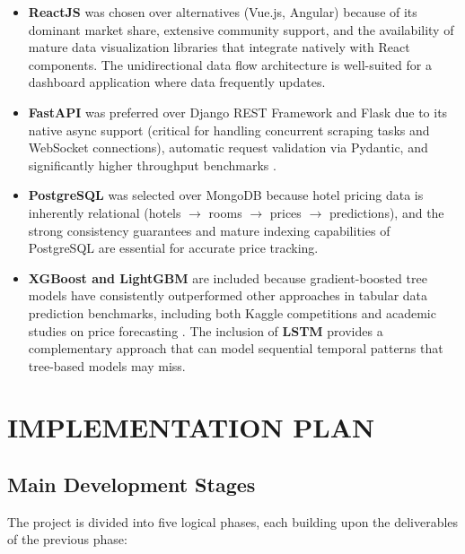 \documentclass[12pt,a4paper]{report}
\begin{document}
\begin{itemize}
    \item \textbf{ReactJS} was chosen over alternatives (Vue.js, Angular) because of its dominant market share, extensive community support, and the availability of mature data visualization libraries that integrate natively with React components. The unidirectional data flow architecture is well-suited for a dashboard application where data frequently updates.
    
    \item \textbf{FastAPI} was preferred over Django REST Framework and Flask due to its native async support (critical for handling concurrent scraping tasks and WebSocket connections), automatic request validation via Pydantic, and significantly higher throughput benchmarks \cite{fastapi2024}.
    
    \item \textbf{PostgreSQL} was selected over MongoDB because hotel pricing data is inherently relational (hotels $\rightarrow$ rooms $\rightarrow$ prices $\rightarrow$ predictions), and the strong consistency guarantees and mature indexing capabilities of PostgreSQL are essential for accurate price tracking.
    
    \item \textbf{XGBoost and LightGBM} are included because gradient-boosted tree models have consistently outperformed other approaches in tabular data prediction benchmarks, including both Kaggle competitions and academic studies on price forecasting \cite{chen2016, ke2017}. The inclusion of \textbf{LSTM} provides a complementary approach that can model sequential temporal patterns that tree-based models may miss.
\end{itemize}


\chapter{IMPLEMENTATION PLAN}

\section{Main Development Stages}

The project is divided into five logical phases, each building upon the deliverables of the previous phase:
\end{document}
